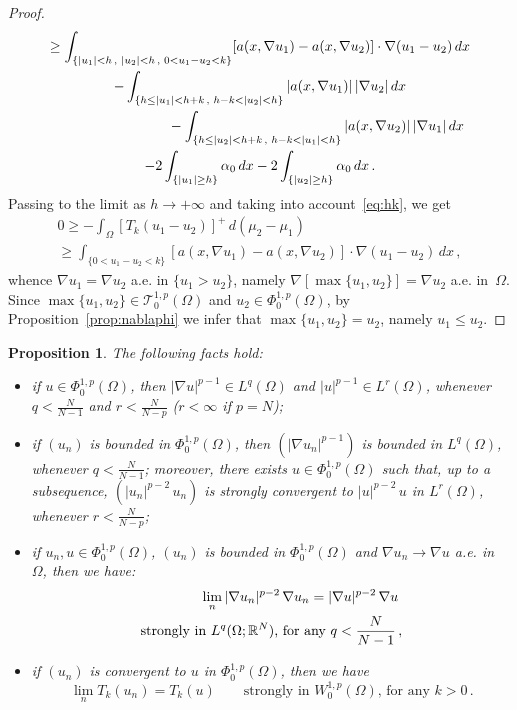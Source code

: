 \documentclass[twoside,reqno]{amsart}
\numberwithin{equation}{section}
\newtheorem{prop}[thm]{Proposition}
\theoremstyle{definition}
\newcommand{\R}{\mathbb{R}}
\begin{document}
\begin{proof}
\begin{multline*}
\geq
\int_{\{|u_1|<h\,,\,\,|u_2|<h\,,\,\,0<u_1-u_2<k\}} 
[a(x,\nabla u_1)-a(x,\nabla u_2)]\cdot\nabla(u_1 - u_2)\,dx \\
- \int_{\{h\leq |u_1| < h+k\,,\,\,h-k<|u_2|<h\}} 
|a(x,\nabla u_1)|\,|\nabla u_2|\,dx \\
\null\qquad\qquad\qquad\qquad
- \int_{\{h\leq |u_2| < h+k\,,\,\,h-k<|u_1|<h\}} 
|a(x,\nabla u_2)|\,|\nabla u_1|\,dx \\
- 2 \int_{\{|u_1|\geq h\}} 
\alpha_0\,dx 
- 2 \int_{\{|u_2|\geq h\}} 
\alpha_0\,dx\,.
\end{multline*}
Passing to the limit as $h\to+\infty$ and taking into
account~\eqref{eq:hk}, we get
\begin{multline*}
0\geq 
- \int_{\Omega} [T_k(u_1 - u_2)]^+\,d(\mu_2-\mu_1) \\
\geq
\int_{\{0<u_1-u_2<k\}} 
[a(x,\nabla u_1)-a(x,\nabla u_2)]\cdot\nabla(u_1 - u_2)\,dx\,,
\end{multline*}
whence $\nabla u_1=\nabla u_2$ a.e. in $\{u_1>u_2\}$, namely
$\nabla[\max\{u_1,u_2\}] = \nabla u_2$ a.e. in~$\Omega$.
Since $\max\{u_1,u_2\}\in\mathcal{T}^{1,p}_0(\Omega)$ and 
$u_2\in\Phi^{1,p}_0(\Omega)$, by Proposition~\ref{prop:nablaphi}
we infer that $\max\{u_1,u_2\}=u_2$, namely $u_1\leq u_2$.
\end{proof}
%
\begin{prop}
\label{prop:Phi}
The following facts hold:
\begin{itemize}
\item[$(a)$]
if $u\in \Phi^{1,p}_0(\Omega)$, then 
$|\nabla u|^{p-1}\in L^q(\Omega)$ and
$|u|^{p-1} \in L^r(\Omega)$,
whenever $q<\frac{N}{N-1}$ and $r<\frac{N}{N-p}$
($r<\infty$ if $p=N$);
\item[$(b)$]
if $(u_n)$ is bounded in $\Phi^{1,p}_0(\Omega)$,
then $(|\nabla u_n|^{p-1})$ is bounded in $L^q(\Omega)$,
whenever $q<\frac{N}{N-1}$;
moreover, there exists $u\in\Phi^{1,p}_0(\Omega)$ such that, 
up to a subsequence, $(|u_n|^{p-2}\,u_n)$ is strongly convergent 
to $|u|^{p-2}\,u$  in $L^r(\Omega)$, whenever $r<\frac{N}{N-p}$;
\item[$(c)$]
if $u_n, u \in \Phi^{1,p}_0(\Omega)$,
$(u_n)$ is bounded in $\Phi^{1,p}_0(\Omega)$ and
$\nabla u_n \to \nabla u$ a.e. in~$\Omega$, then we have: 
\begin{multline*}
\null\qquad\qquad
\lim_n |\nabla u_n|^{p-2}\,\nabla u_n 
= |\nabla u|^{p-2}\,\nabla u \\
\text{strongly in $L^q(\Omega;\R^N)$, 
for any $q<\frac{N}{N-1}$}\,,
\end{multline*}
\item[$(d)$]
if $(u_n)$ is convergent to $u$ in 
$\Phi^{1,p}_0(\Omega)$, then we have
\[
\lim_n T_k(u_n) = T_k(u) 
\qquad\text{strongly in $W^{1,p}_0(\Omega)$, for any $k>0$}\,.
\]
\end{itemize}
\end{prop}
\end{document}
